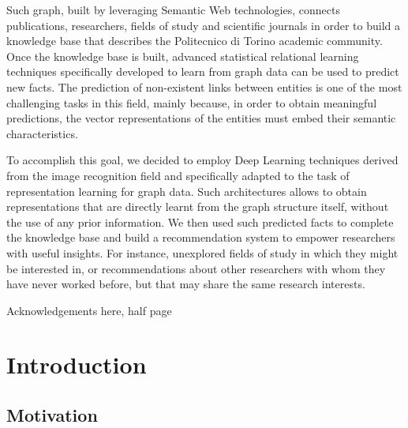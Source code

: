 \documentclass[%
    corpo=13.5pt,
    twoside,
    oldstyle,
    tipotesi=magistrale,
    greek,
    evenboxes
]{toptesi}
\begin{document}
Such graph, built by leveraging Semantic Web technologies, connects
publications, researchers, fields of study and scientific journals in order
to build a knowledge base that describes the Politecnico di Torino academic
community.
Once the knowledge base is built, advanced statistical relational learning
techniques specifically developed to learn from graph data can be used to
predict new facts.
The prediction of non-existent links between entities is one of the
most challenging tasks in this field, mainly because, in order to obtain
meaningful predictions, the vector representations of the entities must
embed their semantic characteristics.

To accomplish this goal, we decided to employ Deep Learning techniques derived
from the image recognition field and specifically adapted to the task of
representation learning for graph data. Such architectures
allows to obtain representations that are directly learnt from the graph
structure itself, without the use of any prior information.
We then used such predicted facts to complete the knowledge base and
build a recommendation system to empower researchers with useful
insights. For instance, unexplored fields of study in which they might be
interested in, or recommendations about other researchers with whom they have
never worked before, but that may share the same research interests.

\ringraziamenti

Acknowledgements here, half page


\tablespagetrue\figurespagetrue %
\indici

\mainmatter

\chapter{Introduction}

\section{Motivation}
\end{document}
